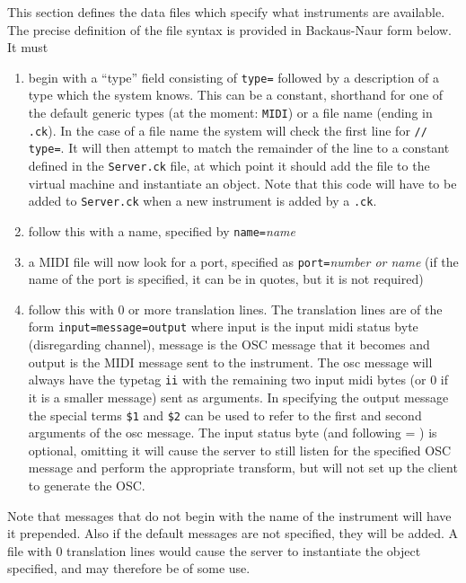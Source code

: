 \documentclass[12pt]{article}
\begin{document}
This section defines the data files which specify what instruments are available. The precise definition of the file syntax is provided in 
Backaus-Naur form below. 
It must 
\begin{enumerate} [\bfseries a)]
\item{begin with a ``type'' field consisting of \texttt{type=} followed by a description of a type which the system knows. This can be
a constant, shorthand for one of the default generic types (at the moment: \texttt{MIDI}) or a file name (ending in \texttt{.ck}). In the case of a file name
the system will check the first line for \texttt{// type=}. It will then attempt to match the remainder of the line to a constant defined in the \texttt{Server.ck}
file, at which point it should add the file to the virtual machine and instantiate an object. Note that this code will have to be added to \texttt{Server.ck}
when a new instrument is added by a \texttt{.ck}.}
\item{follow this with a name, specified by \texttt{name=}\textit{name}}
\item{a MIDI file will now look for a port, specified as \texttt{port=}\textit{number or name}} (if the name of the port is specified, it can be in quotes,
 but it is not required)
\item{follow this with 0 or more translation lines. The translation lines are of the form \texttt{input=message=output} where input is the input midi
	 status byte (disregarding channel), message is the OSC message that it becomes and output is the MIDI message sent to the instrument.
	 The osc message will always have the typetag \texttt{ii} with the remaining two input midi bytes (or 0 if it is a smaller message) sent as 
	 arguments. In specifying the output message the special terms \texttt{\$1} and \texttt{\$2} can be used to refer to the first and second arguments
	 of the osc message. The input status byte (and following = ) is optional, omitting it will cause the server to still listen for the specified OSC
	 message and perform the appropriate transform, but will not set up the client to generate the OSC.}

\end{enumerate}

Note that messages that do not begin with the name of the instrument will have it prepended. Also if the default messages are not specified, 
they will be added.
A file with 0 translation lines would cause the server to instantiate the object specified, and may therefore be of some use.
\end{document}
